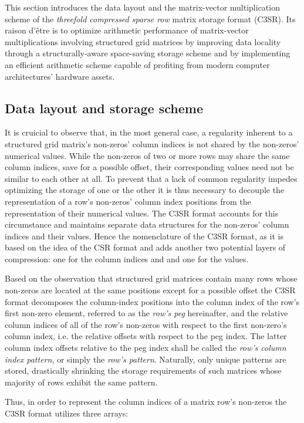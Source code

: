 \documentclass{article}
\begin{document}
  This section introduces the data layout and the matrix-vector multiplication scheme of the \emph{threefold compressed sparse row} matrix storage format (C3SR). Its raison d'être is to optimize arithmetic performance of matrix-vector multiplications involving structured grid matrices by improving data locality through a structurally-aware space-saving storage scheme and by implementing an efficient arithmetic scheme capable of profiting from modern computer architectures' hardware assets.

  \subsection{Data layout and storage scheme}

    It is cruicial to observe that, in the most general case, a regularity inherent to a structured grid matrix's non-zeros' column indices is not shared by the non-zeros' numerical values. While the non-zeros of two or more rows may share the same column indices, save for a possible offset, their corresponding values need not be similar to each other at all. To prevent that a lack of common regularity impedes optimizing the storage of one or the other it is thus necessary to decouple the representation of a row's non-zeros' column index positions from the representation of their numerical values. The C3SR format accounts for this circumstance and maintains separate data structures for the non-zeros' column indices and their values. Hence the nomenclature of the C3SR format, as it is based on the idea of the CSR format and adds another two potential layers of compression: one for the column indices and and one for the values.

    Based on the observation that structured grid matrices contain many rows whose non-zeros are located at the same positions except for a possible offset the C3SR format decomposes the column-index positions into the column index of the row's first non-zero element, referred to as the \emph{row's peg} hereinafter, and the relative column indices of all of the row's non-zeros with respect to the first non-zero's column index, i.e. the relative offsets with respect to the peg index. The latter column index offsets relative to the peg index shall be called the \emph{row's column index pattern}, or simply the \emph{row's pattern}. Naturally, only unique patterns are stored, drastically shrinking the storage requirements of such matrices whose majority of rows exhibit the same pattern.

    Thus, in order to represent the column indices of a matrix row's non-zeros the C3SR format utilizes three arrays:
\end{document}
